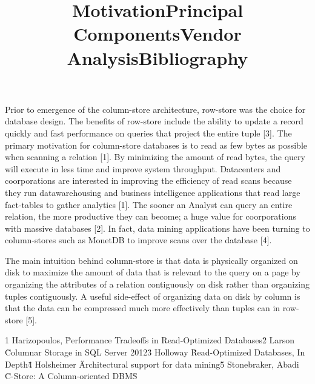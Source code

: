 \documentclass[11pt, onecolumn]{report}
\begin{document}
\title{Motivation}
Prior to emergence of the column-store architecture, row-store was the choice for database design. The benefits of row-store include the ability to update a record quickly and fast performance on queries that project the entire tuple [3]. The primary motivation for column-store databases is to read as few bytes as possible when scanning a relation [1]. By minimizing the amount of read bytes, the query will execute in less time and improve system throughput. Datacenters and coorporations are interested in improving the efficiency of read scans because they run datawarehousing and business intelligence applications that read large fact-tables to gather analytics [1]. The sooner an Analyst can query an entire relation, the more productive they can become; a huge value for coorporations with massive databases [2]. In fact, data mining applications have been turning to column-stores such as MonetDB to improve scans over the database [4]. 

\title{Principal Components}
The main intuition behind column-store is that data is physically organized on disk to maximize the amount of data that is relevant to the query on a page by organizing the attributes of a relation contiguously on disk rather than organizing tuples contiguously. A useful side-effect of organizing data on disk by column is that the data can be compressed much more effectively than tuples can in row-store [5].

\title{Vendor Analysis}


\title{Bibliography}
1 Harizopoulos, \"Performance Tradeoffs in Read-Optimized Databases\"
2 Larson \"Columnar Storage in SQL Server 2012\"
3 Holloway \"Read-Optimized Databases, In Depth\"
4 Holsheimer \"Architectural support for data mining\"
5 Stonebraker, Abadi \"C-Store: A Column-oriented DBMS\"
\end{document}
